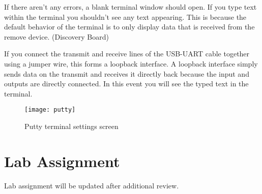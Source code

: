 \documentclass[11pt,fleqn]{book} %
\begin{document}
If there aren't any errors, a blank terminal window should open. If you type text within the terminal you shouldn't see any text appearing. This is because the default behavior of the terminal is to only display data that is received from the remove device. (Discovery Board) 

If you connect the transmit and receive lines of the USB-UART cable together using a jumper wire, this forms a loopback interface. A loopback interface simply sends data on the transmit and receives it directly back because the input and outputs are directly connected. In this event you will see the typed text in the terminal. 

\begin{figure}[]
    \centering\texttt{[image: putty]}
    \caption{Putty terminal settings screen}
    \label{putty}
\end{figure}



\section{Lab Assignment}
Lab assignment will be updated after additional review.
\end{document}

